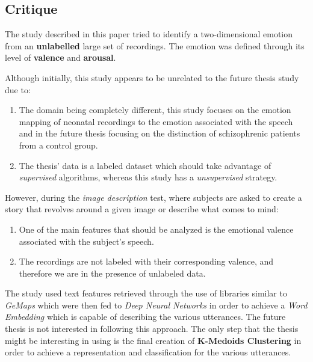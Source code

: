 \documentclass{Paper_Summary}
\begin{document}
\makepapertitle

\breakline

\begin{center}
    \section*{Critique}
\end{center}

    The study described in this paper tried to identify a two-dimensional emotion from an \textbf{unlabelled} large set of recordings. The emotion was defined through its level of \textbf{valence} and \textbf{arousal}.

    Although initially, this study appears to be unrelated to the future thesis study due to:
    \begin{enumerate}
        \item The domain being completely different, this study focuses on the emotion mapping of neonatal recordings to the emotion associated with the speech and in the future thesis focusing on the distinction of schizophrenic patients from a control group.
        \item The thesis' data is a labeled dataset which should take advantage of \emph{supervised} algorithms, whereas this study has a \emph{unsupervised} strategy. 
    \end{enumerate}
    However, during the \emph{image description} test, where subjects are asked to create a story that revolves around a given image or describe what comes to mind:
    \begin{enumerate}
        \item One of the main features that should be analyzed is the emotional valence associated with the subject's speech.
        \item The recordings are not labeled with their corresponding valence, and therefore we are in the presence of unlabeled data.
    \end{enumerate}

    The study used text features retrieved through the use of libraries similar to \emph{GeMaps} which were then fed to \emph{Deep Neural Networks} in order to achieve a \emph{Word Embedding} which is capable of describing the various utterances. The future thesis is not interested in following this approach. The only step that the thesis might be interesting in using is the final creation of \textbf{K-Medoids Clustering} in order to achieve a representation and classification for the various utterances.
\end{document}

